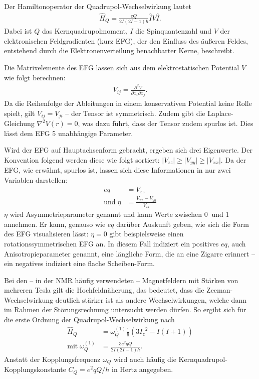 Der Hamiltonoperator der Quadrupol-Wechselwirkung lautet \cite[S. 208]{levitt}
\begin{align}
	\hat{H}_Q = \frac{eQ}{2I (2I - 1) \hbar} \hat{I} V \hat{I}.
\end{align}
Dabei ist $Q$ das Kernquadrupolmoment, $I$ die Spinquantenzahl und $V$ der elektronischen Feldgradienten (kurz EFG), der den Einfluss des äußeren Feldes, entstehend durch die Elektronenverteilung benachbarter Kerne, beschreibt.

Die Matrixelemente des EFG lassen sich aus dem elektrostatischen Potential $V$ wie folgt berechnen:
\begin{align}
	V_{ij} = \frac{\partial^2 V}{\partial x_i \partial x_j}.
\end{align}
Da die Reihenfolge der Ableitungen in einem konservativen Potential keine Rolle spielt, gilt $V_{ij} = V_{ji}$ -- der Tensor ist symmetrisch. Zudem gibt die Laplace-Gleichung $\nabla^2 V(r) = 0$, was dazu führt, dass der Tensor zudem spurlos ist. Dies lässt dem EFG 5 unabhängige Parameter.

Wird der EFG auf Hauptachsenform gebracht, ergeben sich drei Eigenwerte. Der Konvention folgend werden diese wie folgt sortiert: $\lvert V_{zz} \rvert \ge \lvert V_{yy} \rvert \ge \lvert V_{xx} \rvert$. Da der EFG, wie erwähnt, spurlos ist, lassen sich diese Informationen in nur zwei Variablen darstellen:
\begin{align}
	eq                & = V_{zz}                         \\
	\text{und}\; \eta & = \frac{V_{xx} - V_{yy}}{V_{zz}}
\end{align}
$\eta$ wird Asymmetrieparameter genannt und kann Werte zwischen $\SI{0}{}$ und $\SI{1}{}$ annehmen. Er kann, genauso wie $eq$ darüber Auskunft geben, wie sich die Form des EFG visualisieren lässt: $\eta = 0$ gibt beispielsweise einen rotationssymmetrischen EFG an. In diesem Fall indiziert ein positives $eq$, auch Anisotropieparameter genannt, eine längliche Form, die an eine Zigarre erinnert -- ein negatives indiziert eine flache Scheiben-Form.

Bei den -- in der NMR häufig verwendeten -- Magnetfeldern mit Stärken von mehreren Tesla gilt die Hochfeldnäherung, das bedeutet, dass die Zeeman-Wechselwirkung deutlich stärker ist als andere Wechselwirkungen, welche dann im Rahmen der Störungsrechnung untersucht werden dürfen. So ergibt sich für die erste Ordnung der Quadrupol-Wechselwirkung nach \cite[S. 209]{levitt}
\begin{align}
	\hat{H}_Q                   & = \omega_Q^{(1)} \frac{1}{6} \left( 3 {I_z}^2 - I(I + 1) \right) \\
	\text{mit}\; \omega_Q^{(1)} & = \frac{3e^2qQ}{2I(2I - 1) \hbar}.
\end{align}
Anstatt der Kopplungsfrequenz $\omega_Q$ wird auch häufig die Kern\-quad\-ru\-pol-Kopp\-lungs\-kon\-stan\-te $C_Q = e^2qQ / h$ in Hertz angegeben.

